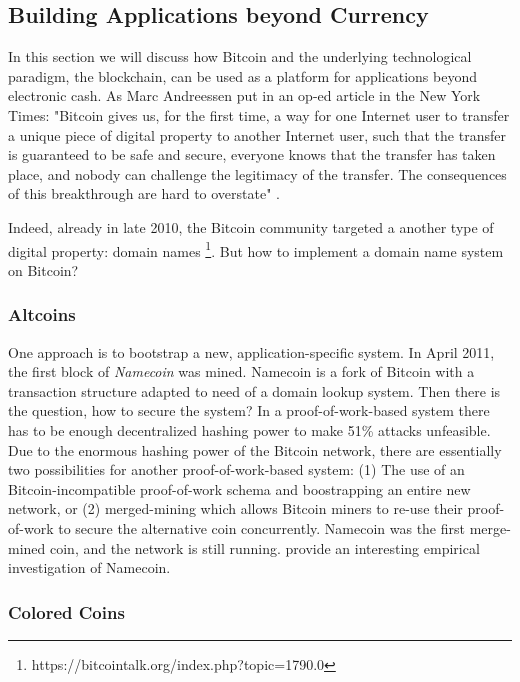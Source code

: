 \subsection{Building Applications beyond Currency}
\label{sec:apps_beyond_currency}

In this section we will discuss how Bitcoin and the underlying technological paradigm, the blockchain, can be used as a platform for applications beyond electronic cash. 
As Marc Andreessen put in an op-ed article in the New York Times: "Bitcoin gives us, for the first time, a way for one Internet user to transfer a unique piece of digital property to another Internet user, such that the transfer is guaranteed to be safe and secure, everyone knows that the transfer has taken place, and nobody can challenge the legitimacy of the transfer. The consequences of this breakthrough are hard to overstate" \cite{andreessen2014}.

Indeed, already in late 2010, the Bitcoin community targeted a another type of digital property: domain names
\footnote{https://bitcointalk.org/index.php?topic=1790.0}. But how to implement a domain name system on Bitcoin?

\subsubsection{Altcoins}
One approach is to bootstrap a new, application-specific system. In April 2011, the first block of \emph{Namecoin} was mined. Namecoin is a fork of Bitcoin with a transaction structure adapted to need of a domain lookup system. Then there is the question, how to secure the system? In a proof-of-work-based system there has to be enough decentralized hashing power to make 51\% attacks unfeasible. Due to the enormous hashing power of the Bitcoin network, there are essentially two possibilities for another proof-of-work-based system: (1) The use of an Bitcoin-incompatible proof-of-work schema and boostrapping an entire new network, or (2) merged-mining which allows Bitcoin miners to re-use their proof-of-work to secure the alternative coin concurrently. 
Namecoin was the first merge-mined coin, and the network is still running. \cite{kalodner2015empirical} provide an interesting empirical investigation of Namecoin. 

\subsubsection{Colored Coins}
\label{sec:coloredcoins}


